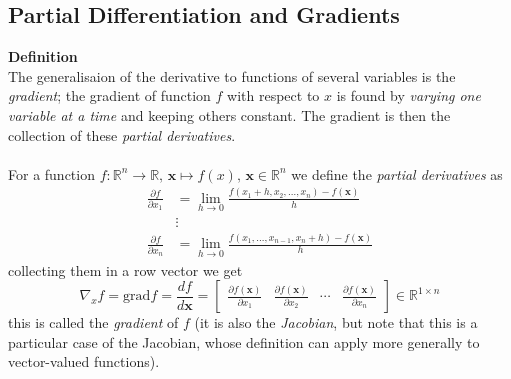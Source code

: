 \documentclass{report}
\begin{document}
\subsection{Partial Differentiation and Gradients}%
\textbf{Definition}\\
The generalisaion of the derivative to functions of several variables is the \textit{gradient}; the gradient of
function $f$ with respect to $x$ is found by \textit{varying one variable at a time} and keeping others constant. 
The gradient is then the collection of these \textit{partial derivatives}.\\
\vspace{1mm}\\
For a function $f:\mathbb{R}^n\to\mathbb{R},\,\bm{x}\mapsto f(x),\,\bm{x}\in\mathbb{R}^n$ we
define the \textit{partial derivatives} as
\begin{align*}
\frac{\partial f}{\partial x_1}&=\lim_{h\to0}
\frac{f(x_1+h,x_2,\ldots,x_n)-f(\bm{x})}{h}\\
&\vdots\\
\frac{\partial f}{\partial x_n}&=\lim_{h\to0}
\frac{f(x_1,\ldots,x_{n-1},x_n+h)-f(\bm{x})}{h}
\end{align*}
collecting them in a row vector we get
\begin{equation*}
\nabla_xf=\text{grad}f=\frac{df}{d\bm{x}}=
\begin{bmatrix}\frac{\partial f(\bm{x})}{\partial x_1}&
\frac{\partial f(\bm{x})}{\partial x_2}&\cdots&
\frac{\partial f(\bm{x})}{\partial x_n}
\end{bmatrix}\in\mathbb{R}^{1\times n}
\end{equation*}
this is called the \textit{gradient} of $f$ (it is also the \textit{Jacobian}, but note that this is a particular
case of the Jacobian, whose definition can apply more generally to vector-valued functions).
\newpage
\end{document}
